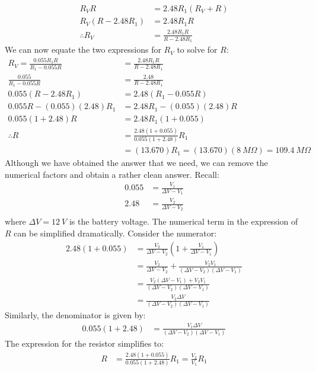 \begin{solution}
\begin{align*}
R_VR&=2.48R_1(R_V+R)\\
R_V(R-2.48R_1)&=2.48R_1R\\
\therefore R_V&=\frac{2.48R_1R}{R-2.48R_1}
\end{align*}
We can now equate the two expressions for $R_V$ to solve for $R$:
\begin{align*}
R_V=\frac{0.055R_1R}{R_1-0.055R}&=\frac{2.48R_1R}{R-2.48R_1}\\
\frac{0.055}{R_1-0.055R}&=\frac{2.48}{R-2.48R_1}\\
0.055(R-2.48R_1)&=2.48(R_1-0.055R)\\
0.055R-(0.055)(2.48)R_1&=2.48R_1-(0.055)(2.48)R\\
0.055(1+2.48)R&=2.48R_1(1+0.055)\\
\therefore R&=\frac{2.48(1+0.055)}{0.055(1+2.48)}R_1\\
&=(13.670)R_1=(13.670)(\SI{8}{M\Omega})=\SI{109.4}{M\Omega}
\end{align*}
Although we have obtained the answer that we need, we can remove the numerical factors and obtain a rather clean answer. Recall:
\begin{align*}
0.055&=\frac{V_1}{\Delta V-V_1}\\
2.48&=\frac{V_2}{\Delta V-V_2}\\
\end{align*}
where $\Delta V=\SI{12}{V}$ is the battery voltage. The numerical term in the expression of $R$ can be simplified dramatically. Consider the numerator:
\begin{align*}
2.48(1+0.055)&=\frac{V_2}{\Delta V-V_2}\left(1+ \frac{V_1}{\Delta V-V_1} \right)\\
&=\frac{V_2}{\Delta V-V_2}+\frac{V_2V_1}{(\Delta V-V_2)(\Delta V-V_1)}\\
&=\frac{V_2(\Delta V-V_1)+V_2V_1}{(\Delta V-V_2)(\Delta V-V_1)}\\
&=\frac{V_2\Delta V}{(\Delta V-V_2)(\Delta V-V_1)}
\end{align*}
Similarly, the denominator is given by:
\begin{align*}
0.055(1+2.48)&=\frac{V_1\Delta V}{(\Delta V-V_2)(\Delta V-V_1)}
\end{align*}
The expression for the resistor simplifies to:
\begin{align*}
R&=\frac{2.48(1+0.055)}{0.055(1+2.48)}R_1=\frac{V_2}{V_1}R_1
\end{align*}
\end{solution}


